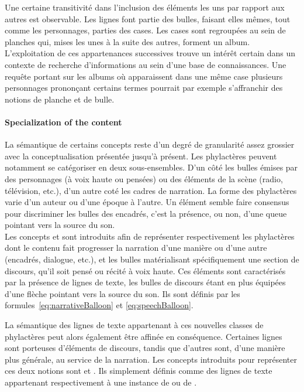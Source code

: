 Une certaine transitivité dans l'inclusion des éléments les uns par rapport aux autres est observable.
Les lignes font partie des bulles, faisant elles mêmes, tout comme les personnages, parties des cases.
Les cases sont regroupées au sein de planches qui, mises les unes à la suite des autres, forment un album.
L'exploitation de ces appartenances successives trouve un intérêt certain dans un contexte de recherche d'informations au sein d'une base de connaissances.
Une requête portant sur les albums où apparaissent dans une même case plusieurs personnages prononçant certains termes pourrait par exemple s'affranchir des notions de planche et de bulle.

\paragraph{Specialization of the content} %
\label{par:specialization_of_the_content}

La sémantique de certains concepts reste d'un degré de granularité assez grossier avec la conceptualisation présentée jusqu'à présent.
Les phylactères peuvent notamment se catégoriser en deux sous-ensembles.
D'un côté les bulles émises par des personnages (à voix haute ou pensées) ou des éléments de la scène (radio, télévision, etc.), d'un autre coté les cadres de narration.
La forme des phylactères varie d'un auteur ou d'une époque à l'autre.
Un élément semble faire consensus pour discriminer les bulles des encadrés, c'est la présence, ou non, d'une queue pointant vers la source du son.\\

Les concepts  et  sont introduits afin de représenter respectivement les phylactères dont le contenu fait progresser la narration d'une manière ou d'une autre (encadrés, dialogue, etc.), et les bulles matérialisant spécifiquement une section de discours, qu'il soit pensé ou récité à voix haute.
Ces éléments sont caractérisés par la présence de lignes de texte, les bulles de discours étant en plus équipées d'une flèche pointant vers la source du son.
Ils sont définis par les formules~\ref{eq:narrativeBalloon} et \ref{eq:speechBalloon}.

La sémantique des lignes de texte appartenant à ces nouvelles classes de phylactères peut alors également être affinée en conséquence.
Certaines lignes sont porteuses d'éléments de discours, tandis que d'autres sont, d'une manière plus générale, au service de la narration.
Les concepts introduits pour représenter ces deux notions sont  et .
Ils simplement définis comme des lignes de texte appartenant respectivement à une instance de  ou de .


